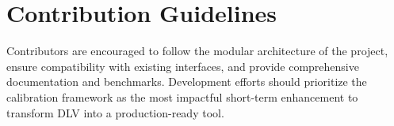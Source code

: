 	\section{Contribution Guidelines}
	
	Contributors are encouraged to follow the modular architecture of the project, ensure compatibility with existing interfaces, and provide comprehensive documentation and benchmarks. Development efforts should prioritize the calibration framework as the most impactful short-term enhancement to transform DLV into a production-ready tool.
	
	\printbibliography

